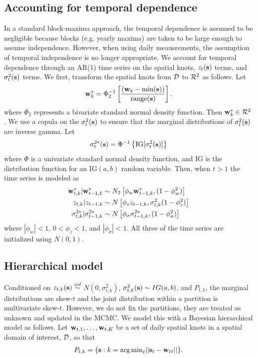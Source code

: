 \documentclass[11pt]{article}
\begin{document}
\subsection{Accounting for temporal dependence} \label{s:temporal}
In a standard block-maxima approach, the temporal dependence is assumed to be negligible because blocks (e.g. yearly maxima) are taken to be large enough to assume independence.
However, when using daily meausrements, the assumption of temporal independence is no longer appropriate.
We account for temporal dependence through an AR(1) time series on the spatial knots, $z_t(\mbox{\bf s})$ terms, and $\sigma^2_t(\mbox{\bf s})$ terms.
We first, transform the spatial knots from ${\cal D}$ to ${\cal R}^2$ as follows.
Let
\begin{align*}
  \mbox{\bf w}^*_k = \Phi^{-1}_2\left[ \frac{ (\mbox{\bf w}_k - \min(\mbox{\bf s}))}{ \text{range}(\mbox{\bf s}) } \right].
\end{align*}
where $\Phi_2$ represents a bivariate standard normal density function.
Then $\mbox{\bf w}^*_k \in {\cal R}^2$.
We use a copula on the $\sigma^2_t(\mbox{\bf s})$ to ensure that the marginal distributions of $\sigma^2_t(\mbox{\bf s})$ are inverse gamma.
Let
\begin{align*}
  \sigma^{2*}_t(\mbox{\bf s}) =\Phi^{-1}\left\{ \text{IG}[\sigma^2_t(\mbox{\bf s})] \right\}
\end{align*}
where $\Phi$ is a univariate standard normal density function, and IG is the distribution function for an IG$(a, b)$ random variable.
Then, when $t > 1$ the time series is modeled as
\begin{align}
  \mbox{\bf w}^*_{t, k} | \mbox{\bf w}^*_{t-1, k} &\sim N_2\left[\phi_w \mbox{\bf w}^*_{t-1, k}, (1 - \phi_w^2) \right] \\
  z_{t, k} | z_{t-1, k} &\sim N \left[\phi_z z_{t-1, k}, \sigma^2_{t,k} (1 - \phi_z^2)\right] \\
  \sigma^{2*}_{t, k} | \sigma^{2*}_{t-1, k} &\sim N \left[\phi_\sigma \sigma^{2*}_{t-1, k}, (1 - \phi_\sigma^2) \right]
\end{align}
where $|\phi_w| < 1$, $0 < \phi_z < 1$, and $|\phi_\sigma| < 1$.
All three of the time series are initialized using $N(0, 1)$.

\subsection{Hierarchical model}\label{s:hier}
Conditioned on $z_{t,k}(\mbox{\bf s}) \stackrel{iid}{\sim} $ $N(0, \sigma^2_{t,k})$, $\sigma^2_{t,k}(\mbox{\bf s}) \sim IG(a, b)$, and $P_{t,k}$, the marginal distributions are skew-$t$ and the joint distribution within a partition is multivariate skew-$t$.
However, we do not fix the partitions, they are treated as unknown and updated in the MCMC.
We model this with a Bayesian hierarchical model as follows.
Let $\mbox{\bf w}_{t,1}, \ldots, \mbox{\bf w}_{t,K}$ be a set of daily spatial knots in a spatial domain of interest, ${\cal D}$, so that
\begin{align*}
 P_{t,k} = \{\mbox{\bf s} : k = {\mathop{\rm arg\, min}}_\ell || \mbox{\bf s}_t - \mbox{\bf w}_{t\ell} ||\}.
\end{align*}
\end{document}
